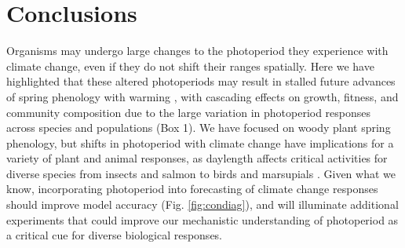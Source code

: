 \documentclass{article}
\begin{document}
\section*{Conclusions}
Organisms may undergo large changes to the photoperiod they experience with climate change, even if they do not shift their ranges spatially. Here we have highlighted that these altered photoperiods may result in stalled future advances of spring phenology with warming \cite[e.g., Box 1.2, Table S1,][]{fu2019, gusewell2017,yu2010}, with cascading effects on growth, fitness, and community composition due to the large variation in photoperiod responses across species and populations (Box 1). We have focused on woody plant spring phenology, but shifts in photoperiod with climate change have implications for a variety of plant and animal responses, as daylength affects critical activities for diverse species from insects \citep{bradshaw2006} and salmon \citep{taranger2003} to birds \citep{dawson2001} and marsupials \citep{mcallan2006}. Given what we know, incorporating photoperiod into forecasting of climate change responses should improve model accuracy (Fig. \ref{fig:condiag}), and will illuminate additional experiments that could improve our mechanistic understanding of photoperiod as a critical cue for diverse biological responses. 
\end{document}
